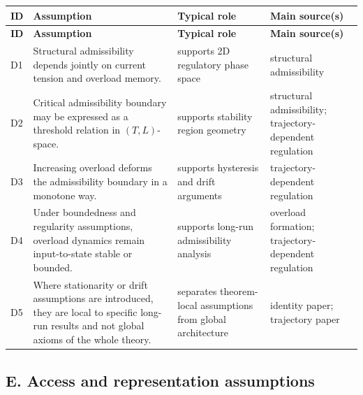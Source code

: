 \documentclass[11pt,a4paper]{article}
\begin{document}
	\begin{longtable}{>{\RaggedRight\arraybackslash}p{}
			>{\RaggedRight\arraybackslash}p{}
			>{\RaggedRight\arraybackslash}p{}
			>{\RaggedRight\arraybackslash}p{}}
		\toprule
		\textbf{ID} & \textbf{Assumption} & \textbf{Typical role} & \textbf{Main source(s)} \\
		\midrule
		\endfirsthead
		\toprule
		\textbf{ID} & \textbf{Assumption} & \textbf{Typical role} & \textbf{Main source(s)} \\
		\midrule
		\endhead
		
		D1 & Structural admissibility depends jointly on current tension and overload memory. & supports 2D regulatory phase space & structural admissibility \\
		
		D2 & Critical admissibility boundary may be expressed as a threshold relation in $(T,L)$-space. & supports stability region geometry & structural admissibility; trajectory-dependent regulation \\
		
		D3 & Increasing overload deforms the admissibility boundary in a monotone way. & supports hysteresis and drift arguments & trajectory-dependent regulation \\
		
		D4 & Under boundedness and regularity assumptions, overload dynamics remain input-to-state stable or bounded. & supports long-run admissibility analysis & overload formation; trajectory-dependent regulation \\
		
		D5 & Where stationarity or drift assumptions are introduced, they are local to specific long-run results and not global axioms of the whole theory. & separates theorem-local assumptions from global architecture & identity paper; trajectory paper \\
		
		\bottomrule
	\end{longtable}
	
	\subsection{E. Access and representation assumptions}
	
\end{document}
